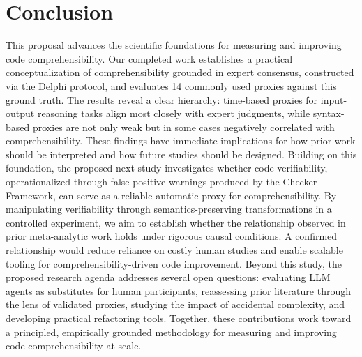 \section{Conclusion}
\label{sec:conclusion}

This proposal advances the scientific foundations for measuring and improving code comprehensibility. Our completed work establishes a practical conceptualization of comprehensibility grounded in expert consensus, constructed via the Delphi protocol, and evaluates 14 commonly used proxies against this ground truth. The results reveal a clear hierarchy: time-based proxies for input-output reasoning tasks align most closely with expert judgments, while syntax-based proxies are not only weak but in some cases negatively correlated with comprehensibility. These findings have immediate implications for how prior work should be interpreted and how future studies should be designed.
Building on this foundation, the proposed next study investigates whether code verifiability, operationalized through false positive warnings produced by the Checker Framework, can serve as a reliable automatic proxy for comprehensibility. By manipulating verifiability through semantics-preserving transformations in a controlled experiment, we aim to establish whether the relationship observed in prior meta-analytic work holds under rigorous causal conditions. A confirmed relationship would reduce reliance on costly human studies and enable scalable tooling for comprehensibility-driven code improvement.
Beyond this study, the proposed research agenda addresses several open questions: evaluating LLM agents as substitutes for human participants, reassessing prior literature through the lens of validated proxies, studying the impact of accidental complexity, and developing practical refactoring tools. Together, these contributions work toward a principled, empirically grounded methodology for measuring and improving code comprehensibility at scale.